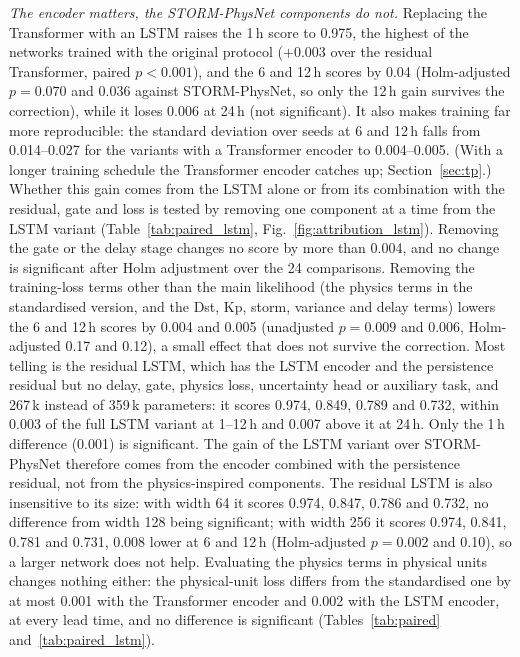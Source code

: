 \documentclass[a4paper,fleqn]{cas-dc}
\begin{document}
\emph{The encoder matters, the STORM-PhysNet components do not.} Replacing the Transformer with an LSTM raises the
1\,h score to 0.975, the highest of the networks trained with the original protocol (\(+0.003\) over the residual Transformer, paired \(p<0.001\)), and the 6 and 12\,h scores by 0.04
(Holm-adjusted \(p=0.070\) and 0.036 against STORM-PhysNet, so only the 12\,h gain survives the correction),
while it loses 0.006 at 24\,h (not significant). It
also makes training far more reproducible: the standard deviation over seeds at 6 and 12\,h falls from
0.014--0.027 for the variants with a Transformer encoder to 0.004--0.005. (With a longer training schedule the
Transformer encoder catches up; Section~\ref{sec:tp}.) Whether this gain comes from the LSTM
alone or from its combination with the residual, gate and loss is tested by removing one component at a time from
the LSTM variant (Table~\ref{tab:paired_lstm}, Fig.~\ref{fig:attribution_lstm}). Removing the gate or the delay
stage changes no score by more than 0.004, and no change is significant after Holm adjustment over the 24
comparisons. Removing the training-loss terms other than the main likelihood (the physics terms in the standardised version,
and the Dst, Kp, storm, variance and delay terms) lowers the 6 and 12\,h scores by 0.004 and 0.005 (unadjusted
\(p=0.009\) and 0.006, Holm-adjusted 0.17 and 0.12), a small effect that does not survive the correction. Most
telling is the residual LSTM, which has the LSTM encoder and the persistence residual but no delay, gate, physics
loss, uncertainty head or auxiliary task, and 267\,k instead of 359\,k parameters: it scores 0.974, 0.849, 0.789
and 0.732, within 0.003 of the full LSTM variant at 1--12\,h and 0.007 above it at 24\,h. Only the 1\,h difference
(0.001) is significant. The gain of the LSTM variant over STORM-PhysNet therefore comes from the encoder combined
with the persistence residual, not from the physics-inspired components. The residual LSTM is also insensitive to
its size: with width 64 it scores 0.974, 0.847, 0.786 and 0.732, no difference from width 128 being significant;
with width 256 it scores 0.974, 0.841, 0.781 and 0.731, 0.008 lower at 6 and 12\,h (Holm-adjusted \(p=0.002\) and
0.10), so a larger network does not help. Evaluating the physics terms in physical units changes nothing
either: the physical-unit loss differs from the standardised one by at most 0.001 with the Transformer encoder
and 0.002 with the LSTM encoder, at every lead time, and no difference is significant (Tables~\ref{tab:paired}
and~\ref{tab:paired_lstm}).
\end{document}
